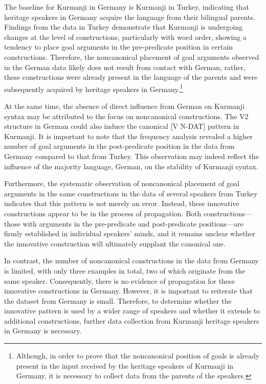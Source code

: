 \largerpage
The baseline for Kurmanji in Germany is Kurmanji in Turkey, indicating that heritage speakers in Germany acquire the language from their bilingual parents. Findings from the data in Turkey demonstrate that Kurmanji is undergoing changes at the level of constructions, particularly with word order, showing a tendency to place goal arguments in the pre-predicate position in certain constructions. Therefore, the noncanonical placement of goal arguments observed in the German data likely does not result from contact with German, rather, these constructions were already present in the language of the parents and were subsequently acquired by heritage speakers in Germany.\footnote{{Although, in order to prove that the noncanonical position of goals is already present in the input received by the heritage speakers of Kurmanji in Germany, it is necessary to collect data from the parents of the speakers.}}

At the same time, the absence of direct influence from German on Kurmanji syntax may be attributed to the focus on noncanonical constructions. The V2 structure in German could also induce the canonical [V N-DAT] pattern in Kurmanji. It is important to note that the frequency analysis revealed a higher number of goal arguments in the post-predicate position in the data from Germany compared to that from Turkey. This observation may indeed reflect the influence of the majority language, German, on the stability of Kurmanji syntax.

Furthermore, the systematic observation of noncanonical placement of goal arguments in the same constructions in the data of several speakers from Turkey indicates that this pattern is not merely an error. Instead, these innovative constructions appear to be in the process of propagation. Both constructions—those with arguments in the pre-predicate and post-predicate positions—are firmly established in individual speakers’ minds, and it remains unclear whether the innovative construction will ultimately supplant the canonical one.

In contrast, the number of noncanonical constructions in the data from Germany is limited, with only three examples in total, two of which originate from the same speaker. Consequently, there is no evidence of propagation for these innovative constructions in Germany. However, it is important to reiterate that the dataset from Germany is small. Therefore, to determine whether the innovative pattern is used by a wider range of speakers and whether it extends to additional constructions, further data collection from Kurmanji heritage speakers in Germany is necessary.

